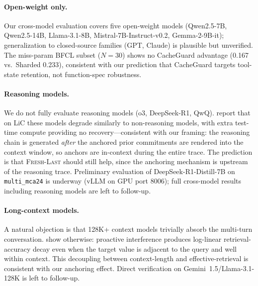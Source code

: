 \documentclass{article}
\begin{document}
\paragraph{Open-weight only.}
Our cross-model evaluation covers five open-weight models (Qwen2.5-7B, Qwen2.5-14B, Llama-3.1-8B, Mistral-7B-Instruct-v0.2, Gemma-2-9B-it); generalization to closed-source families (GPT, Claude) is plausible but unverified. The miss-param BFCL subset ($N=30$) shows no CacheGuard advantage (0.167 vs.\ Sharded 0.233), consistent with our prediction that CacheGuard targets tool-state retention, not function-spec robustness.

\paragraph{Reasoning models.}
We do not fully evaluate reasoning models (o3, DeepSeek-R1, QwQ). \citet{laban2025lost} report that on LiC these models degrade similarly to non-reasoning models, with extra test-time compute providing no recovery---consistent with our framing: the reasoning chain is generated \emph{after} the anchored prior commitments are rendered into the context window, so anchors are in-context during the entire trace. The prediction is that \textsc{Fresh-Last} should still help, since the anchoring mechanism is upstream of the reasoning trace. Preliminary evaluation of DeepSeek-R1-Distill-7B on \texttt{multi\_mca24} is underway (vLLM on GPU port 8006); full cross-model results including reasoning models are left to follow-up.

\paragraph{Long-context models.}
A natural objection is that 128K+ context models trivially absorb the multi-turn conversation. \citet{wang2025proactive} show otherwise: proactive interference produces log-linear retrieval-accuracy decay even when the target value is adjacent to the query and well within context. This decoupling between context-length and effective-retrieval is consistent with our anchoring effect. Direct verification on Gemini~1.5/Llama-3.1-128K is left to follow-up.
\end{document}
